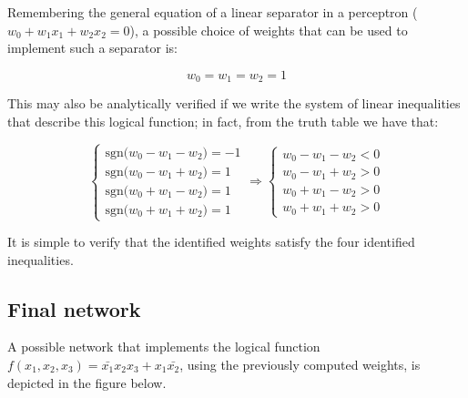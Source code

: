 \documentclass[letterpaper,headings=standardclasses]{scrartcl}
\begin{document}
Remembering the general equation of a linear separator in a perceptron ($ w_0 + w_1x_1 + w_2x_2 = 0 $), a possible choice of weights that can be used to implement such a separator is:

$$ w_0 = w_1 = w_2 = 1 $$

This may also be analytically verified if we write the system of linear inequalities that describe this logical function; in fact, from the truth table we have that:

$$ \begin{cases} \text{sgn(} w_0 - w_1 - w_2 \text{)} = -1 \\ \text{sgn(} w_0 - w_1 + w_2 \text{)} = 1 \\ \text{sgn(} w_0 + w_1 - w_2 \text{)} = 1 \\ \text{sgn(} w_0 + w_1 + w_2 \text{)} = 1 \end{cases} \Rightarrow \begin{cases} w_0 - w_1 - w_2 < 0 \\ w_0 - w_1 + w_2 > 0 \\ w_0 + w_1 - w_2 > 0 \\ w_0 + w_1 + w_2 > 0 \end{cases} $$

It is simple to verify that the identified weights satisfy the four identified inequalities.

\subsection{Final network}

A possible network that implements the logical function $f(x_1,x_2,x_3) = \bar{x_1} x_2 x_3 + x_1 \bar{x_2}$, using the previously computed weights, is depicted in the figure below.
\end{document}
